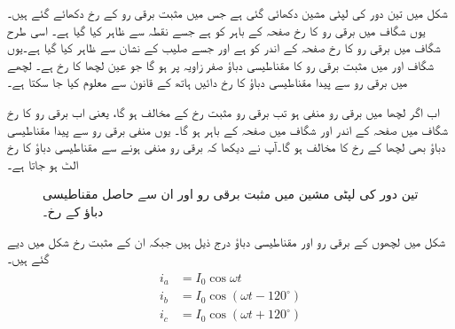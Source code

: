 شکل   میں تین دور کی لپٹی مشین دکھائی گئی ہے جس میں مثبت برقی رو کے رخ  دکھائے گئے ہیں۔یوں   شگاف میں برقی رو کا رخ صفحہ کے    باہر کو  ہے  جسے نقطہ سے ظاہر کیا گیا ہے۔ اسی طرح  شگاف میں برقی رو کا رخ صفحہ  کے     اندر  کو ہے اور  جسے صلیب کے نشان سے ظاہر کیا گیا ہے۔یوں شگاف  اور  میں مثبت برقی رو کا مقناطیسی دباؤ  صفر زاویہ پر ہو گا جو عین لچھا  کا رخ  ہے۔ لچھے میں برقی رو سے پیدا مقناطیسی دباؤ  کا رخ دائیں ہاتھ کے قانون سے معلوم کیا جا سکتا ہے۔

 اب اگر لچھا  میں برقی رو منفی ہو تب برقی رو مثبت رخ کے مخالف ہو گا، یعنی اب برقی رو کا رخ  شگاف   میں صفحہ کے    اندر  اور شگاف   میں  صفحہ کے    باہر ہو گا۔ یوں منفی برقی رو سے پیدا مقناطیسی دباؤ بھی لچھا  کے رخ کا  مخالف ہو گا۔آپ نے دیکھا کہ برقی رو منفی ہونے سے مقناطیسی دباؤ کا رخ الٹ ہو جاتا ہے۔
\begin{figure}
\centering
\caption{تین دور کی لپٹی مشین میں مثبت برقی رو اور ان سے حاصل مقناطیسی دباؤ کے رخ۔}
\label{شکل_گھومتے_مشین_تین_دوری}
\end{figure}
شکل  میں لچھوں کے برقی رو اور مقناطیسی دباؤ درج ذیل ہیں جبکہ ان کے مثبت رخ شکل میں دیے گئے ہیں۔
\begin{gather}
\begin{aligned}\label{مساوات_گھومتے_مشین_تین_دور_برقی_رو}
i_a&=I_0 \cos \omega t\\
i_b&=I_0 \cos (\omega t-120^{\circ})\\
i_c&=I_0 \cos (\omega t+120^{\circ})
\end{aligned}
\end{gather}
